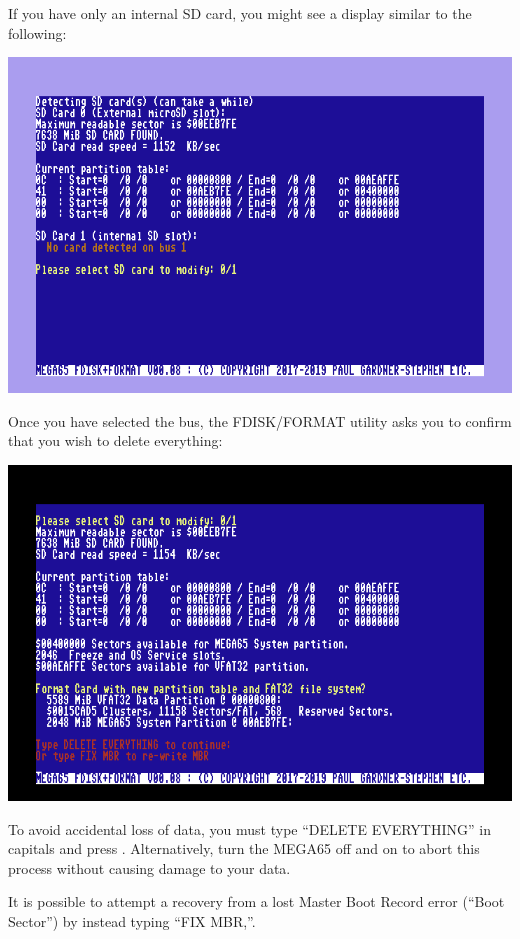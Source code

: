 If you have only an internal SD card, you might see a display similar to the following:

\includegraphics[width=\linewidth]{images/ss-m65fdisk-busselect.png}

Once you have selected the bus, the FDISK/FORMAT utility asks you to confirm that you wish to delete everything:

\includegraphics[width=\linewidth]{images/ss-m65fdisk-typesomething.png}

To avoid accidental loss of data, you must type ``DELETE EVERYTHING'' in capitals and press . Alternatively, turn the MEGA65 off and on to abort this process without causing damage to your data.

It is possible to attempt a recovery from a lost Master Boot Record error (``Boot Sector'') by instead typing ``FIX MBR,''.

